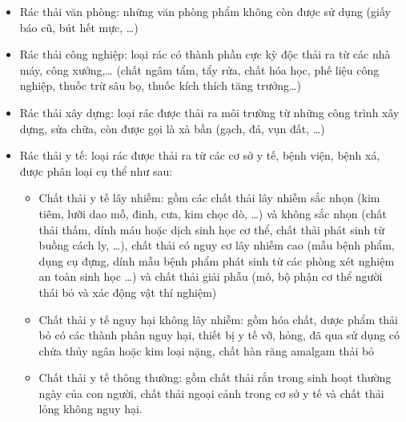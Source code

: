 \begin{itemize}
    \item Rác thải văn phòng: những văn phòng phẩm không còn được sử dụng (giấy báo cũ,  bút hết mực, …)
    \item Rác thải công nghiệp: loại rác có thành phần cực kỳ độc thải ra từ các nhà máy, công xưởng,… (chất ngâm tẩm, tẩy rửa, chất hóa học, phế liệu công nghiệp, thuốc trừ sâu bọ, thuốc kích thích tăng trưởng…) 
    \item Rác thải xây dựng: loại rác được thải ra môi trường từ những công trình xây dựng, sửa chữa, còn được gọi là xà bần (gạch, đá, vụn đất, …)
    \item Rác thải y tế: loại rác được thải ra từ các cơ sở y tế, bệnh viện, bệnh xá, được phân loại cụ thể như sau:
   \begin{itemize}
    \item Chất thải y tế lây nhiễm: gồm các chất thải lây nhiễm sắc nhọn (kim tiêm, lưỡi dao mỗ, đinh, cưa, kim chọc dò, …) và không sắc nhọn (chất thải thấm, dính máu hoặc dịch sinh học cơ thể, chất thải phát sinh từ buồng cách ly, …), chất thải có nguy cơ lây nhiễm cao (mẫu bệnh phẩm, dụng cụ đựng, dính mẫu bệnh phẩm phát sinh từ các phòng xét nghiệm an toàn sinh học …) và chất thải giải phẫu (mô, bộ phận cơ thể người thái bỏ và xác động vật thí nghiệm)
    \item Chất thải y tế nguy hại không lây nhiễm: gồm hóa chất, dược phẩm thải bỏ có các thành phân nguy hại, thiết bị y tế vỡ, hỏng, đã qua sử dụng có chứa thủy ngân hoặc kim loại nặng, chất hàn răng amalgam thải bỏ
    \item Chất thải y tế thông thường: gồm chất thải rắn trong sinh hoạt thường ngày của con người, chất thải ngoại cảnh trong cơ sở y tế và chất thải lỏng không nguy hại.
   \end{itemize}   
\end{itemize}

